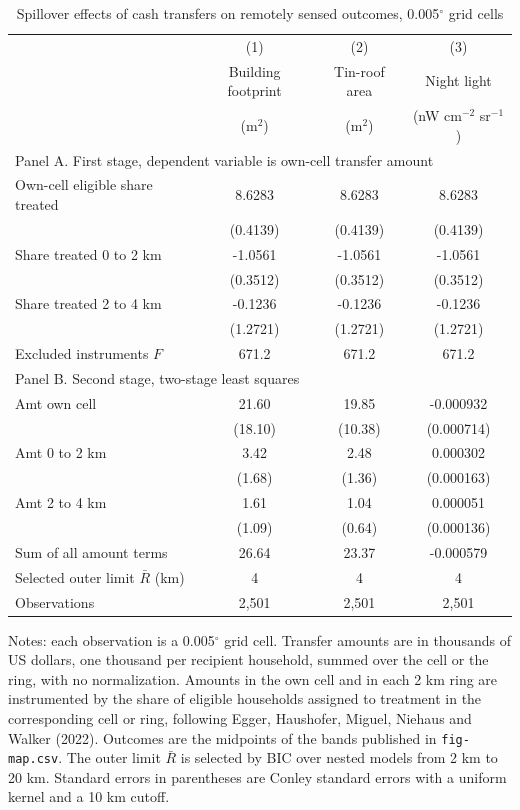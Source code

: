 \begin{table}[htbp]
\centering
\caption{Spillover effects of cash transfers on remotely sensed outcomes, 0.005$^\circ$ grid cells}
\label{tab:eq2-spillovers}
\begin{tabular}{lccc}
\hline\hline
 & (1) & (2) & (3) \\
 & Building footprint & Tin-roof area & Night light \\
 & (m$^2$) & (m$^2$) & (nW cm$^{-2}$ sr$^{-1}$) \\
\hline
\multicolumn{4}{l}{Panel A. First stage, dependent variable is own-cell transfer amount} \\
Own-cell eligible share treated & 8.6283 & 8.6283 & 8.6283 \\
 & (0.4139) & (0.4139) & (0.4139) \\
Share treated 0 to 2 km & -1.0561 & -1.0561 & -1.0561 \\
 & (0.3512) & (0.3512) & (0.3512) \\
Share treated 2 to 4 km & -0.1236 & -0.1236 & -0.1236 \\
 & (1.2721) & (1.2721) & (1.2721) \\
Excluded instruments $F$ & 671.2 & 671.2 & 671.2 \\
\hline
\multicolumn{4}{l}{Panel B. Second stage, two-stage least squares} \\
Amt own cell & 21.60 & 19.85 & -0.000932 \\
 & (18.10) & (10.38) & (0.000714) \\
Amt 0 to 2 km & 3.42 & 2.48 & 0.000302 \\
 & (1.68) & (1.36) & (0.000163) \\
Amt 2 to 4 km & 1.61 & 1.04 & 0.000051 \\
 & (1.09) & (0.64) & (0.000136) \\
Sum of all amount terms & 26.64 & 23.37 & -0.000579 \\
\hline
Selected outer limit $\bar{R}$ (km) & 4 & 4 & 4 \\
Observations & 2,501 & 2,501 & 2,501 \\
\hline\hline
\end{tabular}
\begin{minipage}{\textwidth}
\footnotesize
Notes: each observation is a 0.005$^\circ$ grid cell. Transfer amounts are in thousands of US dollars, one thousand per recipient household, summed over the cell or the ring, with no normalization. Amounts in the own cell and in each 2 km ring are instrumented by the share of eligible households assigned to treatment in the corresponding cell or ring, following Egger, Haushofer, Miguel, Niehaus and Walker (2022). Outcomes are the midpoints of the bands published in \texttt{fig-map.csv}. The outer limit $\bar{R}$ is selected by BIC over nested models from 2 km to 20 km. Standard errors in parentheses are Conley standard errors with a uniform kernel and a 10 km cutoff.
\end{minipage}
\end{table}
